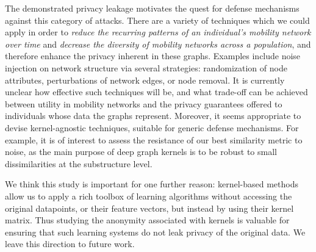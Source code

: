The demonstrated privacy leakage motivates the quest
for defense mechanisms against this category of attacks.
There are a variety of techniques which we could apply in order to \emph{reduce the recurring patterns of an individual's mobility network over time} and \emph{decrease the diversity of mobility networks across a population}, and therefore enhance the privacy inherent in these graphs.
Examples include noise injection on network structure via several strategies: randomization of node attributes, perturbations of network edges, or node removal.
It is currently unclear how effective such techniques will be, and what trade-off can be achieved between utility in mobility networks and the privacy guarantees offered to individuals whose data the graphs represent.
Moreover, it seems appropriate to devise kernel-agnostic techniques, suitable for generic defense mechanisms.
For example, it is of interest to assess the resistance of our best similarity metric to noise, as the main purpose of deep graph kernels is to be robust to small dissimilarities at the substructure level.

We think this study is important for one further reason: kernel-based methods allow us to apply a rich toolbox
of learning algorithms without accessing the original datapoints, or their feature vectors, but instead by using their kernel matrix.
Thus studying the anonymity associated with kernels is valuable for ensuring that such learning systems do not leak privacy of the original data.
We leave this direction to future work.
